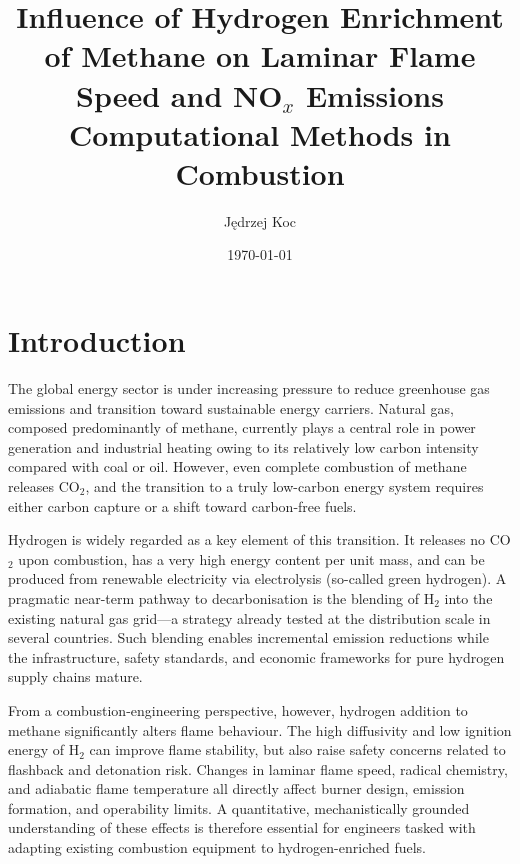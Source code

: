 \documentclass[12pt,a4paper]{article}
\title{%
  \textbf{Influence of Hydrogen Enrichment of Methane on
  Laminar Flame Speed and NO$_x$ Emissions}\\[0.8em]
  \large Computational Methods in Combustion
}
\author{Jędrzej Koc\\[0.3em]
}
\date{\today}
\begin{document}
\maketitle
\thispagestyle{empty}



\newpage
\tableofcontents
\newpage

\section{Introduction}
\label{sec:intro}

The global energy sector is under increasing pressure to reduce greenhouse gas
emissions and transition toward sustainable energy carriers. Natural gas, composed
predominantly of methane, currently plays a central role in power generation and
industrial heating owing to its relatively low carbon intensity compared with coal
or oil. However, even complete combustion of methane releases CO$_2$, and the
transition to a truly low-carbon energy system requires either carbon capture or a
shift toward carbon-free fuels.

Hydrogen is widely regarded as a key element of this transition. It releases no
CO$_2$ upon combustion, has a very high energy content per unit mass, and can be
produced from renewable electricity via electrolysis (so-called green hydrogen).
A pragmatic near-term pathway to decarbonisation is the blending of H$_2$ into
the existing natural gas grid---a strategy already tested at the distribution
scale in several countries. Such blending enables incremental emission reductions
while the infrastructure, safety standards, and economic frameworks for pure
hydrogen supply chains mature.

From a combustion-engineering perspective, however, hydrogen addition to methane
significantly alters flame behaviour. The high diffusivity and low ignition energy
of H$_2$ can improve flame stability, but also raise safety concerns related to
flashback and detonation risk. Changes in laminar flame speed, radical chemistry,
and adiabatic flame temperature all directly affect burner design, emission
formation, and operability limits. A quantitative, mechanistically grounded
understanding of these effects is therefore essential for engineers tasked with
adapting existing combustion equipment to hydrogen-enriched fuels.
\end{document}
